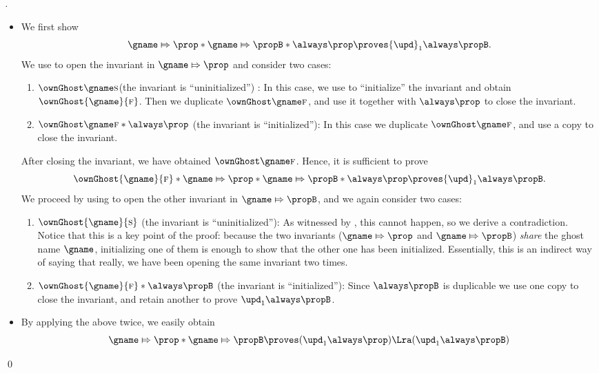 \begin{proof}[]
\begin{itemize}
  \item We first show
    \[\gname \Mapsto \prop * \gname \Mapsto \propB * \always \prop \proves {\upd}_1 \always \propB.\]
    We use  to open the invariant in $\gname \Mapsto \prop$ and consider two cases:
    \begin{enumerate}
    \item $\ownGhost \gname \starttoken$(the invariant is ``uninitialized'') : In this case, we use  to ``initialize'' the invariant and obtain $\ownGhost{\gname}{\finishtoken}$.
      Then we duplicate $\ownGhost \gname \finishtoken$, and use it together with $\always \prop$ to close the invariant.
    \item $\ownGhost \gname \finishtoken * \always \prop$ (the invariant is ``initialized''): In this case we duplicate $\ownGhost \gname \finishtoken$, and use a copy to close the invariant.
    \end{enumerate}
    After closing the invariant, we have obtained $\ownGhost \gname \finishtoken$.
    Hence, it is sufficient to prove
    \[
      \ownGhost{\gname}{\finishtoken} * \gname \Mapsto \prop * \gname \Mapsto \propB * \always \prop \proves {\upd}_1 \always \propB.\]
    We proceed by using  to open the other invariant in $\gname \Mapsto \propB$, and we again consider two cases:
    \begin{enumerate}
    \item $\ownGhost{\gname}{\starttoken}$ (the invariant is ``uninitialized''): As witnessed by , this cannot happen, so we derive a contradiction.
      Notice that this is a key point of the proof: because the two invariants ($\gname \Mapsto \prop$ and $\gname \Mapsto \propB$) \emph{share} the ghost name $\gname$, initializing one of them is enough to show that the other one has been initialized.
      Essentially, this is an indirect way of saying that really, we have been opening the same invariant two times.
    \item $\ownGhost{\gname}{\finishtoken} * \always \propB$ (the invariant is ``initialized''):
      Since $\always \propB$ is duplicable we use one copy to close the invariant, and retain another to prove ${\upd}_1 \always \propB$.
    \end{enumerate}
\item By applying the above twice, we easily obtain
\[ \gname \Mapsto \prop * \gname \Mapsto \propB \proves ({\upd}_1 \always \prop) \Lra ({\upd}_1 \always \propB) \]
\end{itemize}
\qed \end{proof}
